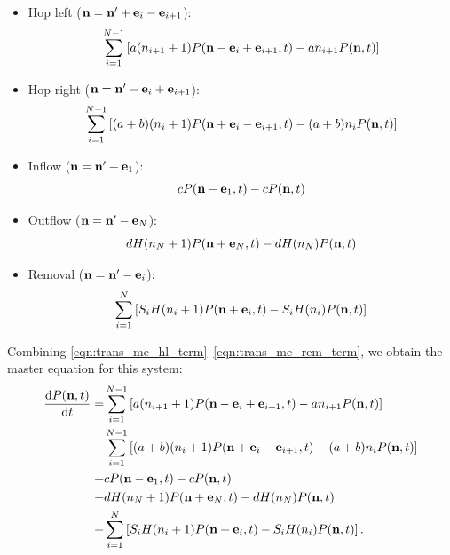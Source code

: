 \begin{itemize}
    \item Hop left (\(\mathbf{n} = \mathbf{n}' + \mathbf{e}_i - \mathbf{e}_{i+1}\)):
        \begin{equation}
            \label{eqn:trans_me_hl_term}
            \sum_{i=1}^{N-1} \left[a(n_{i+1}+1) P(\mathbf{n} - \mathbf{e}_i +
                \mathbf{e}_{i+1},t) - a n_{i+1} P(\mathbf{n},t) \right]
        \end{equation}
    \item Hop right (\(\mathbf{n} = \mathbf{n}' - \mathbf{e}_i + \mathbf{e}_{i+1}\)):
        \begin{equation}
            \label{eqn:trans_me_hr_term}
            \sum_{i=1}^{N-1} \left[(a+b)(n_i+1) P(\mathbf{n} + \mathbf{e}_i -
                \mathbf{e}_{i+1},t) - (a+b)n_i P(\mathbf{n},t) \right]
        \end{equation}
    \item Inflow (\(\mathbf{n} = \mathbf{n}' + \mathbf{e}_1\)):
        \begin{equation}
            \label{eqn:trans_me_in_term}
            cP(\mathbf{n} - \mathbf{e}_1,t) - c P(\mathbf{n},t)
        \end{equation}
    \item Outflow (\(\mathbf{n} = \mathbf{n}' - \mathbf{e}_N\)):
        \begin{equation}
            \label{eqn:trans_me_out_term}
            d H(n_N + 1) P(\mathbf{n} + \mathbf{e}_N,t) - d H(n_N) P(\mathbf{n},t)
        \end{equation}
    \item Removal (\(\mathbf{n} = \mathbf{n}' - \mathbf{e}_i\)):
        \begin{equation}
            \label{eqn:trans_me_rem_term}
            \sum_{i=1}^N \left[ S_i H(n_i + 1) P(\mathbf{n} + \mathbf{e}_i,t) - S_i H(n_i) P(\mathbf{n},t)
                \right]
        \end{equation}
\end{itemize}

Combining \eqref{eqn:trans_me_hl_term}--\eqref{eqn:trans_me_rem_term}, we
obtain the master equation for this system:
\begin{equation}
    \label{eqn:trans_me}
    \begin{split}
        \frac{\mathrm{d} P(\mathbf{n},t)}{\mathrm{d} t} = &
            \sum_{i=1}^{N-1} \left[a(n_{i+1}+1) P(\mathbf{n} - \mathbf{e}_i +
                \mathbf{e}_{i+1},t) - a n_{i+1} P(\mathbf{n},t) \right]\\
            +&\sum_{i=1}^{N-1} \left[(a+b)(n_i+1) P(\mathbf{n} + \mathbf{e}_i -
                \mathbf{e}_{i+1},t) - (a+b)n_i P(\mathbf{n},t) \right]\\
            +&cP(\mathbf{n} - \mathbf{e}_1,t) - c P(\mathbf{n},t)\\
            +&d H(n_N + 1) P(\mathbf{n} + \mathbf{e}_N,t) - d H(n_N) P(\mathbf{n},t)\\
            +&\sum_{i=1}^N \left[ S_i H(n_i + 1) P(\mathbf{n} + \mathbf{e}_i,t) - S_i
                H(n_i) P(\mathbf{n},t)
                \right].
    \end{split}
\end{equation}

